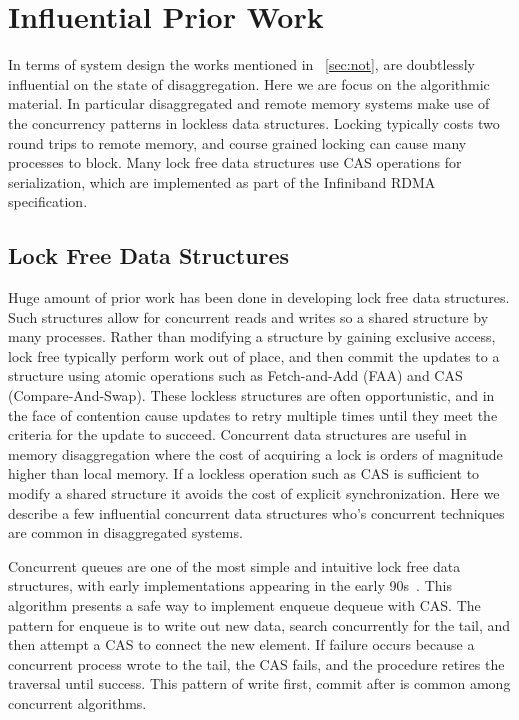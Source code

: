  
\section{Influential Prior Work}

In terms of system design the works mentioned in ~\ref{sec:not}, are doubtlessly
influential on the state of disaggregation. Here we are focus on the algorithmic
material. In particular disaggregated and remote memory systems make use of the
concurrency patterns in lockless data structures. Locking typically costs two
round trips to remote memory, and course grained locking can cause many
processes to block. Many lock free data structures use CAS operations for
serialization, which are implemented as part of the Infiniband RDMA
specification.

\subsection{Lock Free Data Structures}

Huge amount of prior work has been done in developing lock free data structures.
Such structures allow for concurrent reads and writes so a shared structure by
many processes. Rather than modifying a structure by gaining exclusive access,
lock free typically perform work out of place, and then commit the updates to a
structure using atomic operations such as Fetch-and-Add (FAA) and CAS
(Compare-And-Swap). These lockless structures are often opportunistic, and in
the face of contention cause updates to retry multiple times until they meet the
criteria for the update to succeed. Concurrent data structures are useful in
memory disaggregation where the cost of acquiring a lock is orders of magnitude
higher than local memory. If a lockless operation such as CAS is sufficient to
modify a shared structure it avoids the cost of explicit synchronization. Here
we describe a few influential concurrent data structures who's concurrent
techniques are common in disaggregated systems.

Concurrent queues are one of the most simple and intuitive lock free data
structures, with early implementations appearing in the early
90s~\cite{simple-fast}. This algorithm presents a safe way to implement enqueue
dequeue with CAS. The pattern for enqueue is to write out new data, search
concurrently for the tail, and then attempt a CAS to connect the new element. If
failure occurs because a concurrent process wrote to the tail, the CAS fails,
and the procedure retires the traversal until success. This pattern of write
first, commit after is common among concurrent algorithms.

